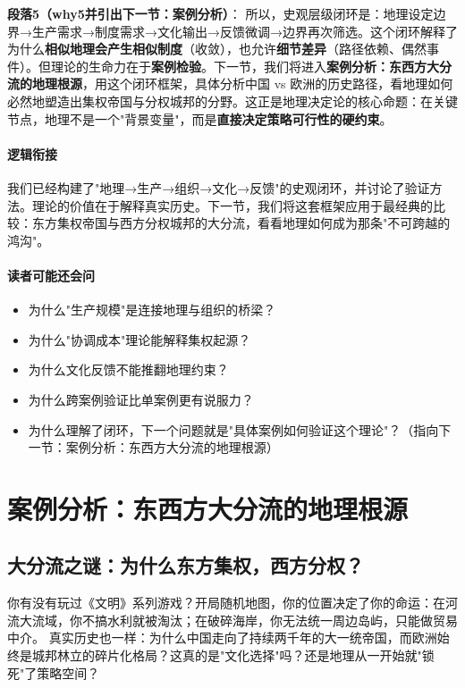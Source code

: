 \documentclass[../main.tex]{subfiles}
\begin{document}
	\textbf{段落5（why5并引出下一节：案例分析）}：  
	所以，史观层级闭环是：地理设定边界→生产需求→制度需求→文化输出→反馈微调→边界再次筛选。这个闭环解释了为什么\textbf{相似地理会产生相似制度}（收敛），也允许\textbf{细节差异}（路径依赖、偶然事件）。但理论的生命力在于\textbf{案例检验}。下一节，我们将进入\textbf{案例分析：东西方大分流的地理根源}，用这个闭环框架，具体分析中国 vs 欧洲的历史路径，看地理如何必然地塑造出集权帝国与分权城邦的分野。这正是地理决定论的核心命题：在关键节点，地理不是一个"背景变量"，而是\textbf{直接决定策略可行性的硬约束}。
	
	\paragraph*{逻辑衔接}
	我们已经构建了"地理→生产→组织→文化→反馈"的史观闭环，并讨论了验证方法。理论的价值在于解释真实历史。下一节，我们将这套框架应用于最经典的比较：东方集权帝国与西方分权城邦的大分流，看看地理如何成为那条"不可跨越的鸿沟"。
	
	\paragraph*{读者可能还会问}
	\begin{itemize}
\item 为什么"生产规模"是连接地理与组织的桥梁？
	\item 为什么"协调成本"理论能解释集权起源？
	\item 为什么文化反馈不能推翻地理约束？
	\item 为什么跨案例验证比单案例更有说服力？
	\item 为什么理解了闭环，下一个问题就是"具体案例如何验证这个理论"？（指向下一节：案例分析：东西方大分流的地理根源）
\end{itemize}
	
	\section{案例分析：东西方大分流的地理根源}

	
	\subsection{大分流之谜：为什么东方集权，西方分权？}
	
	\begin{motivation}
				你有没有玩过《文明》系列游戏？开局随机地图，你的位置决定了你的命运：在河流大流域，你不搞水利就被淘汰；在破碎海岸，你无法统一周边岛屿，只能做贸易中介。
		真实历史也一样：为什么中国走向了持续两千年的大一统帝国，而欧洲始终是城邦林立的碎片化格局？这真的是"文化选择"吗？还是地理从一开始就"锁死"了策略空间？
	\end{motivation}
	
\end{document}
